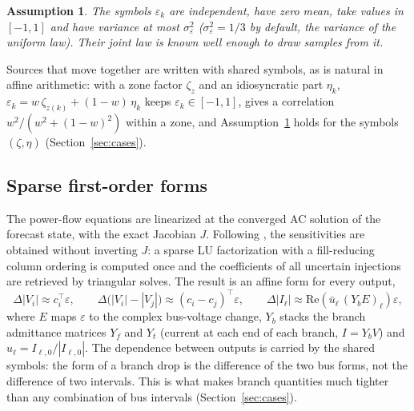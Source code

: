 \documentclass[preprint,12pt]{elsarticle}
\newtheorem{assumption}{Assumption}
\begin{document}
\begin{assumption}\label{as:sym}
The symbols $\varepsilon_k$ are independent, have zero mean, take values in $[-1,1]$ and have variance at most
$\sigma_\varepsilon^2$ ($\sigma_\varepsilon^2 = 1/3$ by default, the variance of the uniform law). Their joint law
is known well enough to draw samples from it.
\end{assumption}
\noindent Sources that move together are written with shared symbols, as is natural in affine arithmetic: with a
zone factor $\zeta_z$ and an idiosyncratic part $\eta_k$, $\varepsilon_k = w\,\zeta_{z(k)} + (1-w)\,\eta_k$ keeps
$\varepsilon_k\in[-1,1]$, gives a correlation $w^2/(w^2+(1-w)^2)$ within a zone, and Assumption~\ref{as:sym} holds
for the symbols $(\zeta,\eta)$ (Section~\ref{sec:cases}).

\subsection{Sparse first-order forms}
The power-flow equations are linearized at the converged AC solution of the forecast state, with the exact Jacobian
$J$. Following \cite{bolognani2015fast,stott2009dc}, the sensitivities are obtained without inverting $J$: a sparse
LU factorization with a fill-reducing column ordering \cite{davis2006direct} is computed once and the coefficients of
all uncertain injections are retrieved by triangular solves. The result is an affine form for every output,
\begin{equation}\label{eq:forms}
\Delta|V_i| \approx c_i^\top\varepsilon,\qquad
\Delta\big(|V_i| - |V_j|\big) \approx (c_i - c_j)^\top\varepsilon,\qquad
\Delta|I_\ell| \approx \mathrm{Re}\!\left(\bar u_\ell\,(Y_b E)_\ell\right)\varepsilon,
\end{equation}
where $E$ maps $\varepsilon$ to the complex bus-voltage change, $Y_b$ stacks the branch admittance matrices
$Y_f$ and $Y_t$ (current at each end of each branch, $I = Y_b V$) and $u_\ell = I_{\ell,0}/|I_{\ell,0}|$. The
dependence between outputs is carried by the shared symbols: the form of a branch drop is the difference of the two
bus forms, not the difference of two intervals. This is what makes branch quantities much tighter than any
combination of bus intervals (Section~\ref{sec:cases}).
\end{document}
